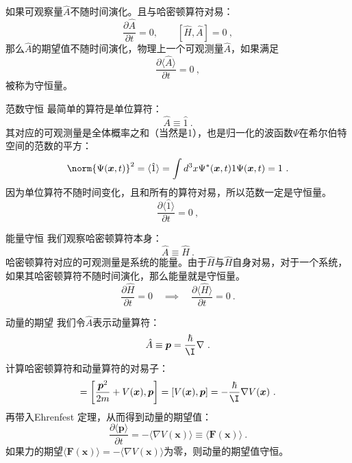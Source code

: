 如果可观察量$\hat A$不随时间演化。且与哈密顿算符对易：
\begin{equation}
\frac{\partial \hat A}{\partial t}=0,\qquad[\hat H, \hat A]=0~,
\end{equation}
那么$\hat A$的期望值不随时间演化，物理上一个可观测量$\hat A$，如果满足
\begin{equation}
\frac{\partial\langle \hat A\rangle}{\partial t}=0~,
\end{equation}
被称为守恒量。
\begin{example}{范数守恒}
最简单的算符是单位算符：
\begin{equation}
\hat A\equiv \hat 1~.
\end{equation}
其对应的可观测量是全体概率之和（当然是1），也是归一化的波函数$\Psi$在希尔伯特空间的范数的平方：
\begin{equation}
\norm{\Psi(\boldsymbol{x}, t)}^2 = \langle\hat{1}\rangle=\int d^{3}x \Psi^{*}(\boldsymbol{x}, t) 1 \Psi(\boldsymbol{x}, t)=1~.
\end{equation}
因为单位算符不随时间变化，且和所有的算符对易，所以范数一定是守恒量。
\begin{equation}
\frac{\partial\langle \hat 1\rangle}{\partial t}=0~,
\end{equation}
\end{example}
\begin{example}{能量守恒}
我们观察哈密顿算符本身：
\begin{equation}
\hat A\equiv \hat H~.
\end{equation}
哈密顿算符对应的可观测量是系统的能量。由于$\hat H$与$\hat H$自身对易，对于一个系统，如果其哈密顿算符不随时间演化，那么能量就是守恒量。
\begin{equation}
\frac{\partial \hat H}{\partial t}=0 \quad\implies\quad \frac{\partial\langle \hat H\rangle}{\partial t}=0~.
\end{equation}
\end{example}
\begin{example}{动量的期望}
我们令$\hat A$表示动量算符：
\begin{equation}
\hat A \equiv \boldsymbol{p} = \frac{\hbar}{\I} \nabla~.
\end{equation}
计算哈密顿算符和动量算符的对易子：
\begin{equation}
[\hat H, \boldsymbol{p}]=\left[\frac{\boldsymbol{p}^2}{2 m}+V(\boldsymbol{x}), \boldsymbol{p}\right]=[V(\boldsymbol{x}), \boldsymbol{p}]=-\frac{\hbar}{\I} \nabla V(\boldsymbol{x})~.
\end{equation}
再带入Ehrenfest 定理，从而得到动量的期望值：
\begin{equation}\label{eq_Ehrenf_1}
\frac{\partial\langle\boldsymbol{p}\rangle}{\partial t}=-\langle\nabla V(\boldsymbol{x})\rangle \equiv\langle\boldsymbol{F}(\boldsymbol{x})\rangle~.
\end{equation}
如果力的期望$\langle\boldsymbol{F}(\boldsymbol{x})\rangle=-\langle\nabla V(\boldsymbol{x})\rangle$为零，则动量的期望值守恒。
\end{example}

